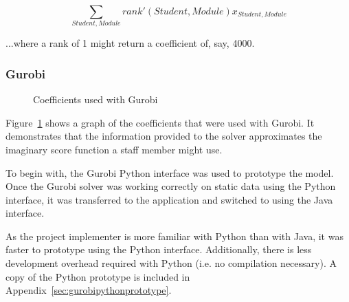 $$\displaystyle\sum_{Student, Module} rank'(Student, Module)x_{Student, Module}$$

...where a rank of 1 might return a coefficient of, say, 4000.

\subsubsection{Gurobi}


\begin{figure}
  \begin{center}
  \end{center}
  \caption{Coefficients used with Gurobi}
  \label{gurobi_coeff}
\end{figure}

Figure~\ref{gurobi_coeff} shows a graph of the coefficients that were used
with Gurobi. It demonstrates that the information provided to the solver
approximates the imaginary score function a staff member might use.

To begin with, the Gurobi Python interface was used to prototype the model.
Once the Gurobi solver was working correctly on static data using the Python
interface, it was transferred to the application and switched to using the
Java interface.

As the project implementer is more familiar with Python than with Java, it was
faster to prototype using the Python interface. Additionally, there is less
development overhead required with Python (i.e. no compilation necessary). A
copy of the Python prototype is included in
Appendix~\ref{sec:gurobipythonprototype}.
